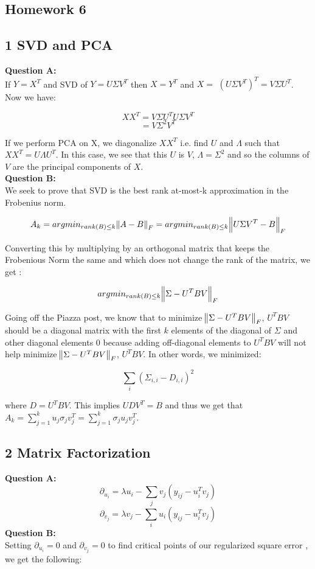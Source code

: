 \documentclass[12 pt]{article}
\begin{document}
	\begin{center}
		\section*{Homework 6}
	\end{center}
	
	
	\subsection*{1 SVD and PCA}	
	\noindent\textbf{Question A:}  \\
	If $Y = X^T$ and SVD of $Y = U \Sigma V^T$ then  $X=Y^T$ and $X = $ ${(U \Sigma V^T)}^T = V \Sigma U^T$. Now we have:
	
	\[ X X^T = V \Sigma U^T U \Sigma V^T\]
	\[       = V \Sigma^2 V^T \]
	
	\noindent If we perform PCA on X, we diagonalize $XX^T$ i.e. find $U$ and $\Lambda$ such that $XX^T = U \Lambda U^T$. In this case, we see that this $U$ is $V$, $\Lambda = \Sigma ^2$ and so the columns of $V$ are the principal components of $X$. \\
	
	
	\noindent\textbf{Question B:}  \\
	We seek to prove that SVD is the best rank at-most-k approximation in the Frobenius norm. 
	
	\[A_k = argmin_{rank(B)\leq k} \norm {A - B}_F = argmin_{rank(B)\leq k} \norm {U \Sigma V^T - B}_F \]
	
	\noindent Converting this by multiplying by an orthogonal matrix that keeps the Frobenious Norm the same and which does not change the rank of the matrix, we get :
	
 	\[ argmin_{rank(B)\leq k} \norm {\Sigma - U^T B V}_F \]
 	
 	\noindent Going off the Piazza post, we know that to minimize $\norm {\Sigma - U^T B V}_F$, $U^TBV$ should be a diagonal matrix with the first $k$ elements of the diagonal of $\Sigma$ and other diagonal elements 0 because adding off-diagonal elements to $U^TBV$ will not help minimize $\norm {\Sigma - U^T B V}_F$, $U^TBV$. In other words, we minimized:
 	
 	\[ \sum_{i}(\Sigma_{i,i} - D_{i,i})^2  \]
 	
 	\noindent where $D = U^TBV$. This implies $UDV^T = B$ and thus we get that $A_k = \sum_{j = 1}^{k} u_j\sigma_jv_j^T = \sum_{j = 1}^{k} \sigma_ju_jv_j^T$.

	
	\subsection*{2 Matrix Factorization}
	\noindent\textbf{Question A:} \\
	\[\partial_{u_i} = \lambda u_i - \sum_{j}v_j (y_{ij} - u_i^Tv_j)\]
	\[\partial_{v_j} = \lambda v_j - \sum_{i}u_i (y_{ij} - u_i^Tv_j)\]
	\noindent\textbf{Question B:} \\
	Setting $\partial_{u_i} = 0$ and $\partial_{v_j} = 0$ to find critical points of our regularized square error , we get the following:
	
\end{document}
